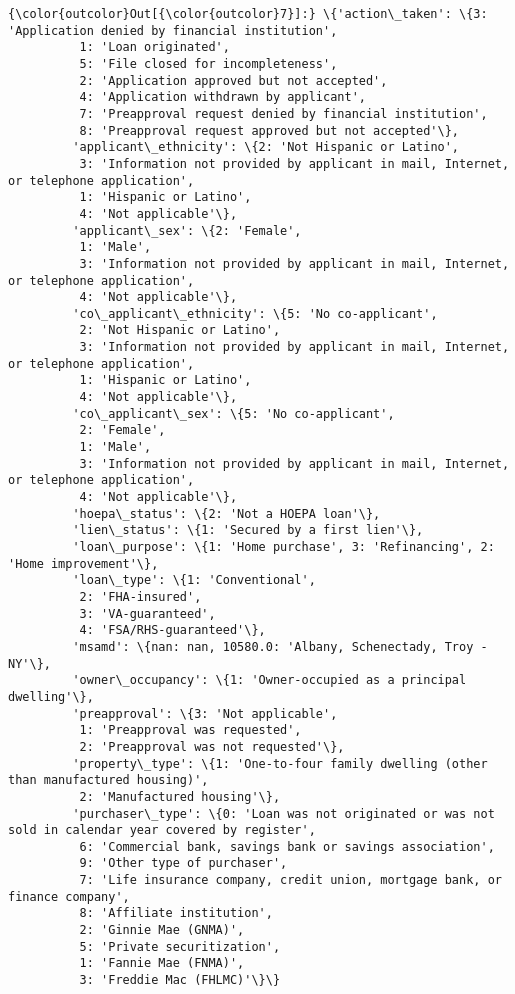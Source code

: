 \documentclass[11pt]{article}
\begin{document}
\begin{Verbatim}[commandchars=\\\{\}]
{\color{outcolor}Out[{\color{outcolor}7}]:} \{'action\_taken': \{3: 'Application denied by financial institution',
          1: 'Loan originated',
          5: 'File closed for incompleteness',
          2: 'Application approved but not accepted',
          4: 'Application withdrawn by applicant',
          7: 'Preapproval request denied by financial institution',
          8: 'Preapproval request approved but not accepted'\},
         'applicant\_ethnicity': \{2: 'Not Hispanic or Latino',
          3: 'Information not provided by applicant in mail, Internet, or telephone application',
          1: 'Hispanic or Latino',
          4: 'Not applicable'\},
         'applicant\_sex': \{2: 'Female',
          1: 'Male',
          3: 'Information not provided by applicant in mail, Internet, or telephone application',
          4: 'Not applicable'\},
         'co\_applicant\_ethnicity': \{5: 'No co-applicant',
          2: 'Not Hispanic or Latino',
          3: 'Information not provided by applicant in mail, Internet, or telephone application',
          1: 'Hispanic or Latino',
          4: 'Not applicable'\},
         'co\_applicant\_sex': \{5: 'No co-applicant',
          2: 'Female',
          1: 'Male',
          3: 'Information not provided by applicant in mail, Internet, or telephone application',
          4: 'Not applicable'\},
         'hoepa\_status': \{2: 'Not a HOEPA loan'\},
         'lien\_status': \{1: 'Secured by a first lien'\},
         'loan\_purpose': \{1: 'Home purchase', 3: 'Refinancing', 2: 'Home improvement'\},
         'loan\_type': \{1: 'Conventional',
          2: 'FHA-insured',
          3: 'VA-guaranteed',
          4: 'FSA/RHS-guaranteed'\},
         'msamd': \{nan: nan, 10580.0: 'Albany, Schenectady, Troy - NY'\},
         'owner\_occupancy': \{1: 'Owner-occupied as a principal dwelling'\},
         'preapproval': \{3: 'Not applicable',
          1: 'Preapproval was requested',
          2: 'Preapproval was not requested'\},
         'property\_type': \{1: 'One-to-four family dwelling (other than manufactured housing)',
          2: 'Manufactured housing'\},
         'purchaser\_type': \{0: 'Loan was not originated or was not sold in calendar year covered by register',
          6: 'Commercial bank, savings bank or savings association',
          9: 'Other type of purchaser',
          7: 'Life insurance company, credit union, mortgage bank, or finance company',
          8: 'Affiliate institution',
          2: 'Ginnie Mae (GNMA)',
          5: 'Private securitization',
          1: 'Fannie Mae (FNMA)',
          3: 'Freddie Mac (FHLMC)'\}\}
\end{Verbatim}
            
\end{document}
